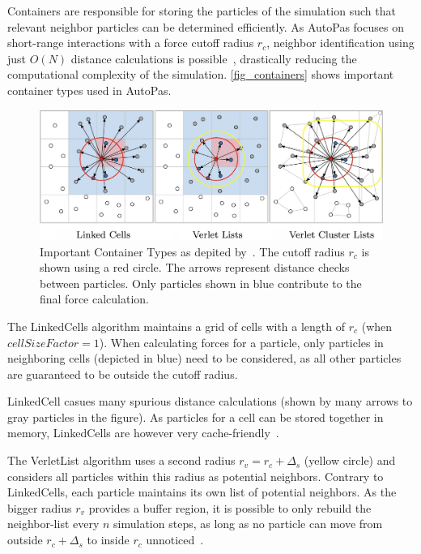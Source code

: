 \documentclass[conference]{IEEEtran}
\begin{document}
\begin{description}[style=nextline]
    \item[Container]

        Containers are responsible for storing the particles of the simulation such that relevant neighbor particles can be determined efficiently. As AutoPas focuses on short-range interactions with a force cutoff radius $r_c$, neighbor identification using just $O(N)$ distance calculations is possible~\cite{Gratl2019AutoPas}, drastically reducing the computational complexity of the simulation. \autoref{fig_containers} shows important container types used in AutoPas.

        \begin{figure}[h]
            \centering
            \includegraphics[width=\columnwidth]{figures/containers.jpg}
            \caption{Important Container Types as depited by~\cite{Gratl2022AutoPas}. The cutoff radius $r_c$ is shown using a red circle. The arrows represent distance checks between particles. Only particles shown in blue contribute to the final force calculation.}
            \label{fig_containers}
        \end{figure}

        \begin{description}[style=nextline, font=\itshape\mdseries]
            \item[LinkedCells]
                The LinkedCells algorithm maintains a grid of cells with a length of $r_c$ (when $cellSizeFactor = 1$). When calculating forces for a particle, only particles in neighboring cells (depicted in blue) need to be considered, as all other particles are guaranteed to be outside the cutoff radius.

                LinkedCell casues many spurious distance calculations (shown by many arrows to gray particles in the figure). As particles for a cell can be stored together in memory, LinkedCells are however very cache-friendly~\cite{Gratl2022AutoPas}.

            \item[VerletLists]
                The VerletList algorithm uses a second radius $r_v = {r_c} + \Delta_s$ (yellow circle) and considers all particles within this radius as potential neighbors. Contrary to LinkedCells, each particle maintains its own list of potential neighbors. As the bigger radius $r_v$ provides a buffer region, it is possible to only rebuild the neighbor-list every $n$ simulation steps, as long as no particle can move from outside $r_c + \Delta_s$ to inside $r_c$ unnoticed~\cite{NEWCOME2023115278}.


\end{description}
\end{description}
\end{document}
